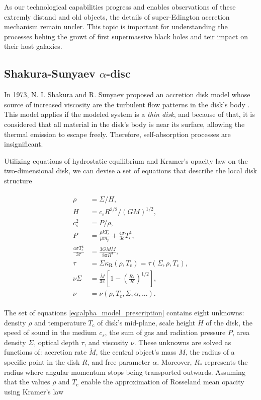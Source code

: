     As our technological capabilities progress and enables observations of these extremly distand and old objects, the details of super-Edington accretion mechanism remain uncler. This topic is important for understanding the processes behing the growt of first supermassive black holes and teir impact on their host galaxies.

\subsection[Shakura-Sunyaev $\alpha$-Disc model]{Shakura-Sunyaev $\alpha$-disc}
    \label{sec:alpha_model_definition}
    In 1973, N. I. Shakura and R. Sunyaev proposed an accretion disk model whose source of increased viscosity are the turbulent flow patterns in the disk's body \citep{shakura1973}. This model applies if the modeled system is a \emph{thin disk}, and because of that, it is considered that all material in the disk's body is near its surface, allowing the thermal emission to escape freely. Therefore, self-absorption processes are insignificant. 

    Utilizing equations of hydrostatic equilibrium and Kramer's opacity law on the two-dimensional disk, we can devise a set of equations that describe the local disk structure \citep{acpow}

    \begin{align}
    \begin{split}
        \rho &= \Sigma / H, \\
        H &= c_{\mathrm{s}} R^{3/2} / (GM)^{1/2}, \\
        c_{\mathrm{s}}^2 &= P / \rho, \\
        P &= \frac{\rho k T_{\mathrm{c}}}{\mu m_p} + \frac{4 \sigma}{3 c}T_c^4, \\
        \frac{a \sigma T_{\mathrm{c}}^4}{3 \tau} &= \frac{3GM\dot{M}}{8 \pi R^3}, \\
        \tau &= \Sigma \kappa_{\mathrm{R}}(\rho, T_{\mathrm{c}}) = \tau(\Sigma, \rho, T_{\mathrm{c}}), \\
        \nu \Sigma &= \frac{\dot{M}}{3 \pi} \left[ 1 - \left( \frac{R_*}{R} \right)^{1/2} \right], \\
        \nu &= \nu(\rho, T_{\mathrm{c}}, \Sigma, \alpha, ...).
    \end{split}
    \label{eq:alpha_model_prescription}
    \end{align}

    The set of equations \eqref{eq:alpha_model_prescription} contains eight unknowns: density $\rho$ and temperature $T_{\mathrm{c}}$ of disk's mid-plane, scale height $H$ of the disk, the speed of sound in the medium $c_s$, the sum of gas and radiation pressure $P$, area density $\Sigma$, optical depth $\tau$, and viscosity $\nu$. These unknowns are solved as functions of: accretion rate $\dot{M}$, the central object's mass $M$, the radius of a specific point in the disk $R$, and free parameter $\alpha$. Moreover, $R_*$ represents the radius where angular momentum stops being transported outwards. Assuming that the values $\rho$ and $T_{\mathrm{c}}$ enable the approximation of Rosseland mean opacity using Kramer's law

